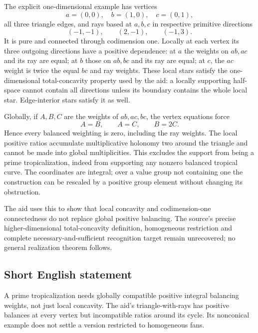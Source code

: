 \documentclass[11pt]{article}
\begin{document}
The explicit one-dimensional example has vertices
\[
 a=(0,0),\quad b=(1,0),\quad c=(0,1),
\]
all three triangle edges, and rays based at \(a,b,c\) in respective primitive directions
\[
 (-1,-1),\qquad(2,-1),\qquad(-1,3).
\]
It is pure and connected through codimension one. Locally at each vertex its three outgoing directions have a positive dependence: at \(a\) the weights on \(ab,ac\) and its ray are equal; at \(b\) those on \(ab,bc\) and its ray are equal; at \(c\), the \(ac\) weight is twice the equal \(bc\) and ray weights. These local stars satisfy the one-dimensional total-concavity property used by the aid: a locally supporting half-space cannot contain all directions unless its boundary contains the whole local star. Edge-interior stars satisfy it as well.

Globally, if \(A,B,C\) are the weights of \(ab,ac,bc\), the vertex equations force
\[
 A=B,\qquad A=C,\qquad B=2C.
\]
Hence every balanced weighting is zero, including the ray weights. The local positive ratios accumulate multiplicative holonomy two around the triangle and cannot be made into global multiplicities. This excludes the support from being a prime tropicalization, indeed from supporting any nonzero balanced tropical curve. The coordinates are integral; over a value group not containing one the construction can be rescaled by a positive group element without changing its obstruction.

The aid uses this to show that local concavity and codimension-one connectedness do not replace global positive balancing. The source's precise higher-dimensional total-concavity definition, homogeneous restriction and complete necessary-and-sufficient recognition target remain unrecovered; no general realization theorem follows.
\subsection{Short English statement}
A prime tropicalization needs globally compatible positive integral balancing weights, not just local concavity. The aid's triangle-with-rays has positive balances at every vertex but incompatible ratios around its cycle. Its nonconical example does not settle a version restricted to homogeneous fans.
\end{document}

